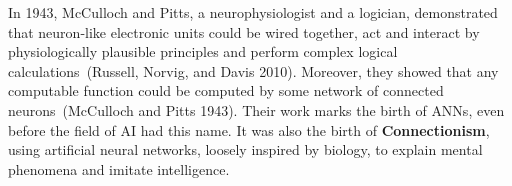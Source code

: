 \documentclass[
  letterpaper,
  12pt,
  british]{tufte-book}
\theoremstyle{plain}
\theoremstyle{definition}
\theoremstyle{plain}
\theoremstyle{remark}
\begin{document}
In 1943, McCulloch and Pitts, a neurophysiologist and a logician,
demonstrated that neuron-like electronic units could be wired together,
act and interact by physiologically plausible principles and perform
complex logical calculations~(Russell, Norvig, and Davis
2010).
Moreover, they showed that any computable function could be computed by
some network of connected neurons~(McCulloch and Pitts
1943).
Their work marks the birth of {ANNs}, even before the field of AI had
this name. It was also the birth of \textbf{Connectionism}, using
artificial neural networks, loosely inspired by biology, to explain
mental phenomena and imitate intelligence.
\end{document}
